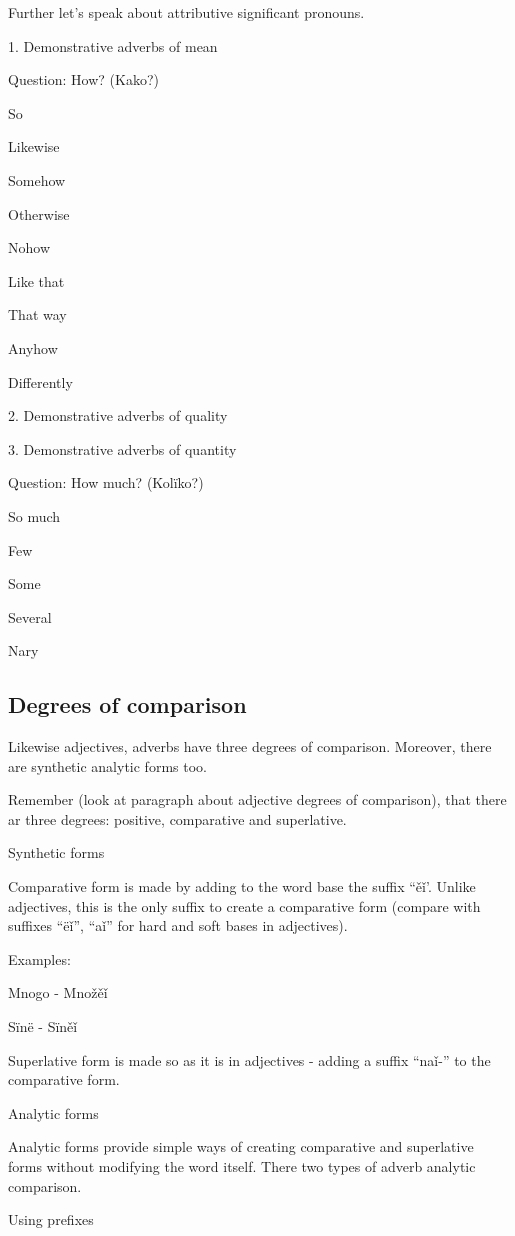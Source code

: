 Further let’s speak about attributive significant pronouns.

1. Demonstrative adverbs of mean

Question: How? (Kako?)

So

Likewise

Somehow

Otherwise

Nohow

Like that

That way

Anyhow

Differently

2. Demonstrative adverbs of quality


3. Demonstrative adverbs of quantity

Question: How much? (Kolïko?)

So much

Few

Some

Several

Nary

\subsection{Degrees of comparison}

Likewise adjectives, adverbs have three degrees of comparison. Moreover, there are synthetic analytic forms too. 

Remember (look at paragraph about adjective degrees of comparison), that there ar three degrees: positive, comparative and superlative.

Synthetic forms

Comparative form is made by adding to the word base the suffix “ěǐ’. Unlike adjectives, this is the only suffix to create a comparative form (compare with suffixes “ëǐ”, “aǐ” for hard and soft bases in adjectives). 

Examples:

Mnogo - Množěǐ

Sïnë - Sïněǐ

Superlative form is made so as it is in adjectives - adding a suffix “naǐ-” to the comparative form.

Analytic forms

Analytic forms provide simple ways of creating comparative and superlative forms without modifying the word itself. There two types of adverb analytic comparison.

Using prefixes


